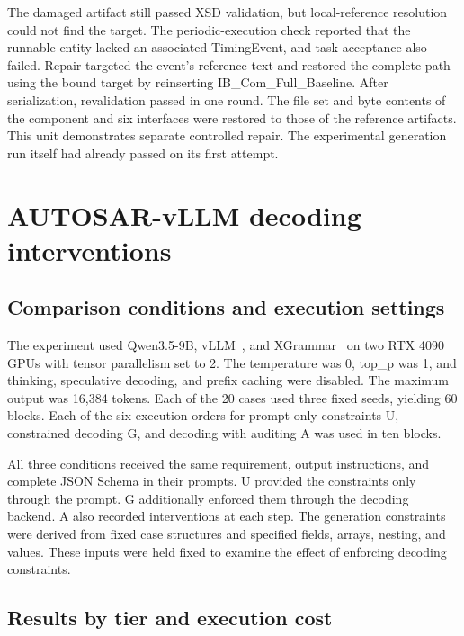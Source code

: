 \documentclass[pdflatex,iicol,sn-mathphys-num]{sn-jnl}
\newcommand{\paperref}[1]{~\citep{#1}}
\begin{document}
The damaged artifact still passed XSD validation, but local-reference resolution could not find the target. The periodic-execution check reported that the runnable entity lacked an associated TimingEvent, and task acceptance also failed. Repair targeted the event's reference text and restored the complete path using the bound target by reinserting IB\_Com\_Full\_Baseline. After serialization, revalidation passed in one round. The file set and byte contents of the component and six interfaces were restored to those of the reference artifacts. This unit demonstrates separate controlled repair. The experimental generation run itself had already passed on its first attempt.


\FloatBarrier

\setcounter{table}{0}

\section{AUTOSAR-vLLM decoding interventions}\label{app:B}

\subsection{Comparison conditions and execution settings}\label{app:B-1}

The experiment used Qwen3.5-9B, vLLM\paperref{Kwon_2023}, and XGrammar\paperref{MLSYS2025_5c20ca4b} on two RTX 4090 GPUs with tensor parallelism set to 2. The temperature was 0, top\_p was 1, and thinking, speculative decoding, and prefix caching were disabled. The maximum output was 16,384 tokens. Each of the 20 cases used three fixed seeds, yielding 60 blocks. Each of the six execution orders for prompt-only constraints U, constrained decoding G, and decoding with auditing A was used in ten blocks.


All three conditions received the same requirement, output instructions, and complete JSON Schema in their prompts. U provided the constraints only through the prompt. G additionally enforced them through the decoding backend. A also recorded interventions at each step. The generation constraints were derived from fixed case structures and specified fields, arrays, nesting, and values. These inputs were held fixed to examine the effect of enforcing decoding constraints.


\subsection{Results by tier and execution cost}\label{app:B-2}
\end{document}
